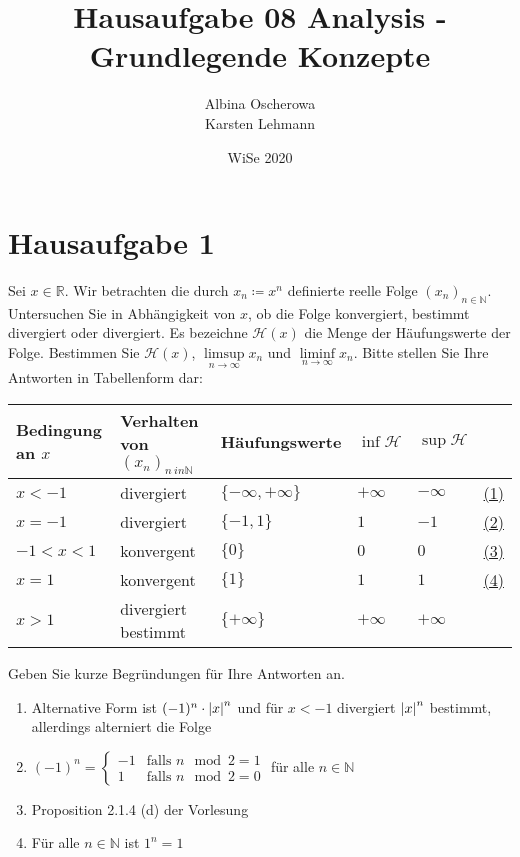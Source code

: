 \documentclass{article}
\author{Albina Oscherowa \\ Karsten Lehmann}
\date{WiSe 2020}
\title{Hausaufgabe 08 Analysis - Grundlegende Konzepte}
\begin{document}
\section*{Hausaufgabe 1}

Sei $x \in \mathbb{R}$. Wir betrachten die durch $x_n \coloneqq x^n$ definierte reelle Folge
$\left(x_n\right)_{n\in\mathbb{N}}$. Untersuchen Sie in Abhängigkeit von $x$, ob die Folge
konvergiert, bestimmt divergiert oder divergiert. Es bezeichne $\mathcal{H}(x)$ die Menge der
Häufungswerte der Folge. Bestimmen Sie $\mathcal{H}(x)$, $\underset{n \to \infty}\limsup x_n$
und $\underset{n \to \infty}\liminf x_n$.
Bitte stellen Sie Ihre Antworten in Tabellenform dar:

\begin{small}
\begin{tabularx}{\textwidth}{X|X|X|X|lr}
Bedingung an $x$ & Verhalten von $\left(x_n\right)_{n\ in \mathbb{N}}$ & Häufungswerte & $\inf \mathcal{H}$ & $\sup \mathcal{H}$ \\
\hline
$x < -1$         & divergiert          & $\{-\infty,  +\infty\}$ & $+\infty$ & $-\infty$ & \hyperref[beg:1]{(1)} \\
$x = -1$         & divergiert          & $\{ -1, 1 \}$           & $1$       & $-1$      & \hyperref[beg:2]{(2)} \\
$-1 < x < 1$     & konvergent          & $\{ 0 \}$               & $0$       & $0$       & \hyperref[beg:3]{(3)} \\
$x = 1$          & konvergent          & $\{ 1 \}$               & $1$       & $1$       & \hyperref[beg:4]{(4)} \\
$x > 1$          & divergiert bestimmt & $\{ +\infty \}$               & $+\infty$ & $+\infty$ \\
\end{tabularx}
\end{small}

\noindent
Geben Sie kurze Begründungen für Ihre Antworten an.

\begin{enumerate}[(1)]
\item
  \label{beg:1} Alternative Form ist $(-1)^n \cdot \abs{x}^n$ und für $x < -1$ divergiert $\abs{x}^n$ bestimmt, allerdings alterniert die Folge
\item
  \label{beg:2} $(-1)^n = \begin{cases}-1 & \text{falls } n \mod 2 = 1\\ 1 & \text{falls } n \mod 2 = 0 \end{cases}$
  für alle $n \in \mathbb{N}$
\item
  \label{beg:3} Proposition 2.1.4 (d) der Vorlesung
\item
  \label{beg:4} Für alle $n \in \mathbb{N}$ ist $1^n = 1$
\end{enumerate}
\end{document}
